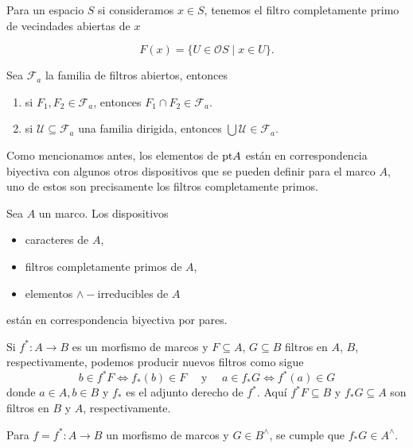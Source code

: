 Para un espacio $S$ si consideramos $x\in S$, tenemos el filtro completamente primo de vecindades abiertas de $x$

\[
F(x)=\{U\in \mathcal{O}S\mid x\in U\}.
\]


\begin{prop}\label{CaracterizacionFabiertos} 
Sea $\mathcal{F}_a$ la familia de filtros abiertos, entonces 
    \begin{enumerate}
        \item si $F_1, F_2\in \mathcal{F}_a$, entonces $F_1\cap F_2 \in \mathcal{F}_a$.
        \item si $\mathcal{U}\subseteq \mathcal{F}_a$ una familia dirigida, entonces $\bigcup \mathcal{U}\in \mathcal{F}_a$.
    \end{enumerate}
\end{prop}

Como mencionamos antes, los elementos de $\mathrm{pt} A$ están en correspondencia biyectiva con algunos otros dispositivos que se pueden definir para el marco $A$, uno de estos son 
precisamente los filtros completamente primos. 

\begin{lem}
    Sea $A$ un marco. Los dispositivos 
    \begin{itemize}
        \item caracteres de $A$,
        \item filtros completamente primos de $A$,
        \item elementos $\wedge-$irreducibles de $A$
    \end{itemize}
    están en correspondencia biyectiva por pares.
\end{lem}

Si $f^*\colon A\to B$ es un morfismo de marcos y $F\subseteq A$, $G\subseteq B$ filtros en $A$, $B$, respectivamente, podemos producir nuevos filtros como sigue
\begin{equation}\label{Imagenfiltros}
b\in f^*F \Leftrightarrow f_*(b)\in F\quad \mbox{ y }\quad a\in f_*G \Leftrightarrow f^*(a)\in G
\end{equation}
donde $a\in A, b\in B$ y $f_*$ es el adjunto derecho de $f^*$. Aquí $f^*F\subseteq B$ y $f_*G\subseteq A$ son filtros en $B$ y $A$, respectivamente.\\

\begin{prop}\label{fF}
    Para $f=f^*\colon A\to B$ un morfismo de marcos y $G\in B^\wedge$, se cumple que $f_*G\in A^\wedge$.
\end{prop}

